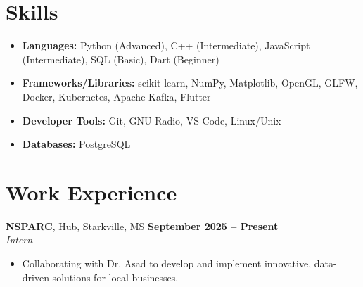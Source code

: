 \documentclass[letterpaper,10pt]{article} %
\begin{document}

\section*{Skills}

\begin{itemize}
    \item \textbf{Languages:} Python (Advanced), C++ (Intermediate), JavaScript (Intermediate), SQL (Basic), Dart (Beginner)
    \item \textbf{Frameworks/Libraries:} scikit-learn, NumPy, Matplotlib, OpenGL, GLFW, Docker, Kubernetes, Apache Kafka, Flutter
    \item \textbf{Developer Tools:} Git, GNU Radio, VS Code, Linux/Unix
    \item \textbf{Databases:} PostgreSQL
\end{itemize}


\section*{Work Experience}

\textbf{NSPARC}, Hub, Starkville, MS \hfill \textbf{September 2025 -- Present} \\
\textit{Intern}
\begin{itemize}
    \item Collaborating with Dr. Asad to develop and implement innovative, data-driven solutions for local businesses. %
\end{itemize}
\end{document}
